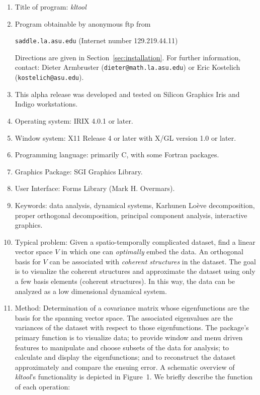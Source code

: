 \begin{enumerate}
\item Title of program: {\sl kltool}
\item Program obtainable by anonymous ftp from
	\begin{center}
	{\tt saddle.la.asu.edu}  (Internet number 129.219.44.11)
	\end{center}
	Directions are given in Section~\ref{sec:installation}.
	For further information, contact:  Dieter Armbruster
		({\tt dieter@math.la.asu.edu}) or Eric Kostelich
		({\tt kostelich@asu.edu}).
\item This alpha release was developed and
	tested on Silicon Graphics Iris and Indigo workstations. 
\item Operating system:  IRIX 4.0.1 or later.
\item Window system:  X11 Release 4 or later with X/GL version 1.0 or later.
\item Programming language: primarily C, with some Fortran packages.
\item Graphics Package: SGI Graphics Library.
\item User Interface: Forms Library (Mark H. Overmars).
\item Keywords: data analysis, dynamical
	systems,   Karhunen Lo\`{e}ve decomposition, proper
	orthogonal decomposition, principal component analysis,
	interactive graphics.
\item Typical problem: Given a spatio-temporally complicated
dataset, find a linear vector space $V$ in which one can {\sl optimally} embed
the data.  An orthogonal basis for $V$ can be associated
with {\sl coherent structures} in the dataset. The goal is to visualize
the coherent structures and approximate the dataset using only a few
basis elements (coherent structures).   In this way, the data can
be analyzed as a low dimensional dynamical system.
\item Method: Determination of a covariance matrix whose
eigenfunctions are the basis for the spanning vector space.  The
associated eigenvalues are the variances of the dataset with respect to
those eigenfunctions. The package's primary function is to visualize
data; to provide window and menu driven features to manipulate and
choose subsets of the data for analysis; to calculate and display
the eigenfunctions; and to reconstruct the dataset approximately
and compare the ensuing error.
A schematic overview of {\sl kltool}'s
functionality is depicted in Figure~1.  We briefly describe the
function of each operation:
\begin{figure}[t]


\end{figure}
\end{enumerate}
